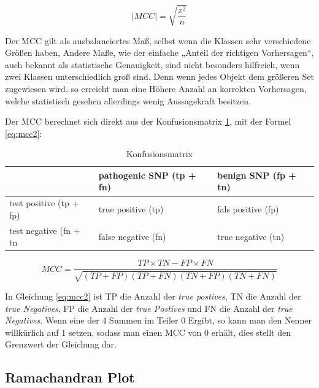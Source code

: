 \begin{equation}
    |MCC| = \sqrt{\frac{x^2}{n}}
    \label{eq:mcc}
\end{equation}

Der MCC gilt als ausbalanciertes Maß, selbst wenn die Klassen sehr verschiedene Größen haben, Andere Maße, wie der einfache „Anteil der richtigen Vorhersagen“, auch bekannt als statistische Genauigkeit, sind nicht besonders hilfreich, wenn zwei Klassen unterschiedlich groß sind. Denn wenn jedes Objekt dem größeren Set zugewiesen wird, so erreicht man eine Höhere Anzahl an korrekten Vorhersagen, welche statistisch gesehen allerdings wenig Aussagekraft besitzen.

Der MCC berechnet sich direkt aus der Konfusionsmatrix \ref{table:konfusionsmatrix}, mit der Formel \ref{eq:mcc2}:

\begin{table}[]
\centering
\caption{Konfusionsmatrix }
\label{table:konfusionsmatrix}
\begin{tabular}{l|l|l|}
\cline{2-3}
 & pathogenic SNP (tp + fn) & benign SNP (fp + tn) \\ \hline
\multicolumn{1}{|l|}{test positive (tp + fp)} & \cellcolor[HTML]{9AFF99}true positive (tp) & \cellcolor[HTML]{FFCCC9}fals positive (fp) \\ \hline
\multicolumn{1}{|l|}{test negative (fn + tn} & \cellcolor[HTML]{FFFFC7}false negative (fn) & \cellcolor[HTML]{9AFF99}true negative (tn) \\ \hline
\end{tabular}
\end{table}

\begin{equation}
    MCC = \frac{TP \times TN - FP \times FN}{\sqrt{(TP + FP)(TP + FN)(TN + FP)(TN + FN)}}
    \label{eq:mcc2}
\end{equation}

In Gleichung \ref{eq:mcc2} ist TP die Anzahl der \emph{true postives}, TN die Anzahl der \emph{true Negatives}, FP die Anzahl der \emph{true Postives} und FN die Anzahl der \emph{true Negatives}. Wenn eine der 4 Summen im Teiler 0 Ergibt, so kann man den Nenner willkürlich auf 1 setzen, sodass man einen MCC von 0 erhält, dies stellt den Grenzwert der Gleichung dar.


\subsection{Ramachandran Plot}

